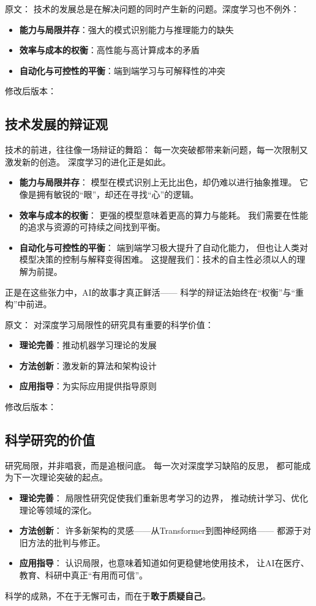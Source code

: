原文：
技术的发展总是在解决问题的同时产生新的问题。深度学习也不例外：
\begin{itemize}
\item \textbf{能力与局限并存}：强大的模式识别能力与推理能力的缺失
\item \textbf{效率与成本的权衡}：高性能与高计算成本的矛盾
\item \textbf{自动化与可控性的平衡}：端到端学习与可解释性的冲突
\end{itemize}
修改后版本：
\subsection{技术发展的辩证观}  
技术的前进，往往像一场辩证的舞蹈：  
每一次突破都带来新问题，每一次限制又激发新的创造。  
深度学习的进化正是如此。  
\begin{itemize}
\item \textbf{能力与局限并存}：  
  模型在模式识别上无比出色，却仍难以进行抽象推理。  
  它像是拥有敏锐的“眼”，却还在寻找“心”的逻辑。  

\item \textbf{效率与成本的权衡}：  
  更强的模型意味着更高的算力与能耗。  
  我们需要在性能的追求与资源的可持续之间找到平衡。  

\item \textbf{自动化与可控性的平衡}：  
  端到端学习极大提升了自动化能力，  
  但也让人类对模型决策的控制与解释变得困难。  
  这提醒我们：技术的自主性必须以人的理解为前提。  
\end{itemize}
正是在这些张力中，AI的故事才真正鲜活——  
科学的辩证法始终在“权衡”与“重构”中前进。



原文：
对深度学习局限性的研究具有重要的科学价值：
\begin{itemize}
\item \textbf{理论完善}：推动机器学习理论的发展
\item \textbf{方法创新}：激发新的算法和架构设计
\item \textbf{应用指导}：为实际应用提供指导原则
\end{itemize}
修改后版本：
\subsection{科学研究的价值}  
研究局限，并非唱衰，而是追根问底。  
每一次对深度学习缺陷的反思，  
都可能成为下一次理论突破的起点。  
\begin{itemize}
\item \textbf{理论完善}：  
  局限性研究促使我们重新思考学习的边界，  
  推动统计学习、优化理论等领域的深化。  
\item \textbf{方法创新}：  
  许多新架构的灵感——从Transformer到图神经网络——  
  都源于对旧方法的批判与修正。  
\item \textbf{应用指导}：  
  认识局限，也意味着知道如何更稳健地使用技术，  
  让AI在医疗、教育、科研中真正“有用而可信”。  
\end{itemize}
科学的成熟，不在于无懈可击，而在于\textbf{敢于质疑自己}。  




